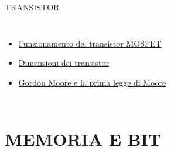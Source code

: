 \documentclass[aspectratio=1610]{beamer}
\begin{document}
\begin{frame}{TRANSISTOR}
\begin{columns}
\begin{itemize}
                \item \tiny{\href{https://www.youtube.com/watch?v=RjHoSgWY3EA}{Funzionamento del transistor MOSFET}}
                \item \tiny{\href{https://www.geopop.it/processori-a-3-nanometri-cosa-sono-e-perche-sono-una-rivoluzione/}{Dimensioni dei transistor}}
                \item \tiny{\href{https://www.geopop.it/addio-a-gordon-moore-chi-era-lideatore-della-legge-sui-transistor-e-co-fondatore-di-intel/}{Gordon Moore e la prima legge di Moore}} 
            \end{itemize}        
    \end{columns}
\end{frame}

\section{MEMORIA E BIT}
\end{document}
